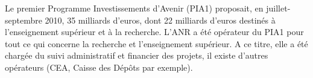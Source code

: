 Le premier Programme Investissements d'Avenir (PIA1) proposait, en juillet-septembre 2010, 35 milliards d'euros, 
dont 22 milliards d'euros destin\'es \`a l'enseignement sup\'erieur et \`a la recherche.
L'ANR a {\'e}t{\'e} op{\'e}rateur du PIA1 pour tout ce qui concerne la recherche et l'enseignement sup{\'e}rieur. 
A ce titre, elle a {\'e}t{\'e} charg{\'e}e du suivi administratif et financier des projets, 
il existe d'autres op{\'e}rateurs (CEA, Caisse des D{\'e}pôts par exemple). 
%
%
